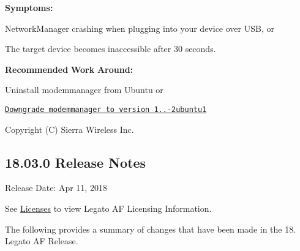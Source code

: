 {\bfseries Symptoms\+:} 
\begin{DoxyItemize}
\item Network\+Manager crashing when plugging into your device over U\+SB, or
\item The target device becomes inaccessible after 30 seconds.
\end{DoxyItemize}

{\bfseries Recommended} {\bfseries Work} {\bfseries Around\+:} 
\begin{DoxyItemize}
\item Uninstall {\ttfamily modemmanager} from Ubuntu or
\item \href{http://packages.ubuntu.com/trusty/modemmanager}{\tt Downgrade {\ttfamily modemmanager} to version 1..-\/2ubuntu1}
\end{DoxyItemize}

Copyright (C) Sierra Wireless Inc. \hypertarget{releaseNotes18030}{}\subsection{18.03.0 Release Notes}\label{releaseNotes18030}
Release Date\+: Apr 11, 2018

See \hyperlink{aboutLicenses}{Licenses} to view Legato AF Licensing Information.

The following provides a summary of changes that have been made in the 18. Legato AF Release.

